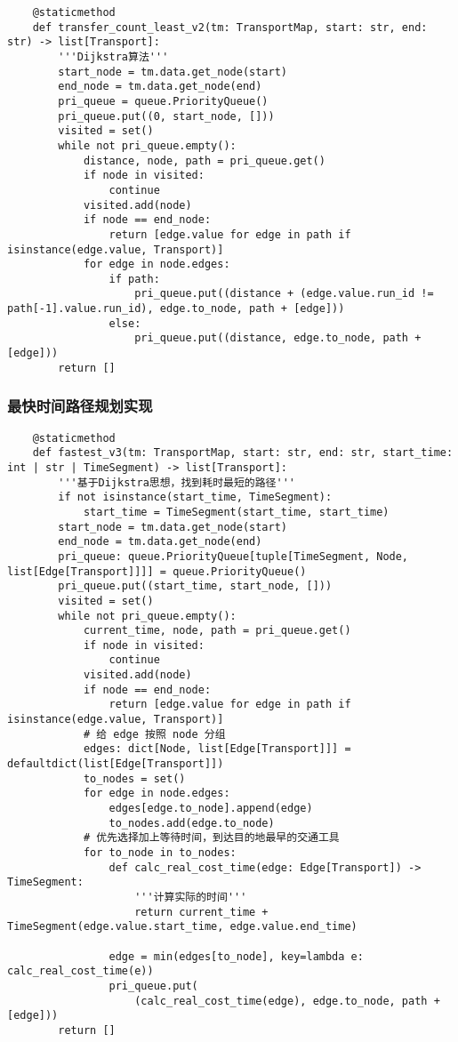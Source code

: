\documentclass[10pt]{article}
\begin{document}
    \begin{lstlisting}
    @staticmethod
    def transfer_count_least_v2(tm: TransportMap, start: str, end: str) -> list[Transport]:
        '''Dijkstra算法'''
        start_node = tm.data.get_node(start)
        end_node = tm.data.get_node(end)
        pri_queue = queue.PriorityQueue()
        pri_queue.put((0, start_node, []))
        visited = set()
        while not pri_queue.empty():
            distance, node, path = pri_queue.get()
            if node in visited:
                continue
            visited.add(node)
            if node == end_node:
                return [edge.value for edge in path if isinstance(edge.value, Transport)]
            for edge in node.edges:
                if path:
                    pri_queue.put((distance + (edge.value.run_id != path[-1].value.run_id), edge.to_node, path + [edge]))
                else:
                    pri_queue.put((distance, edge.to_node, path + [edge]))
        return []
    \end{lstlisting}

    \subsubsection{最快时间路径规划实现}
    \begin{lstlisting}
    @staticmethod
    def fastest_v3(tm: TransportMap, start: str, end: str, start_time: int | str | TimeSegment) -> list[Transport]:
        '''基于Dijkstra思想，找到耗时最短的路径'''
        if not isinstance(start_time, TimeSegment):
            start_time = TimeSegment(start_time, start_time)
        start_node = tm.data.get_node(start)
        end_node = tm.data.get_node(end)
        pri_queue: queue.PriorityQueue[tuple[TimeSegment, Node, list[Edge[Transport]]]] = queue.PriorityQueue()
        pri_queue.put((start_time, start_node, []))
        visited = set()
        while not pri_queue.empty():
            current_time, node, path = pri_queue.get()
            if node in visited:
                continue
            visited.add(node)
            if node == end_node:
                return [edge.value for edge in path if isinstance(edge.value, Transport)]
            # 给 edge 按照 node 分组
            edges: dict[Node, list[Edge[Transport]]] = defaultdict(list[Edge[Transport]])
            to_nodes = set()
            for edge in node.edges:
                edges[edge.to_node].append(edge)
                to_nodes.add(edge.to_node)
            # 优先选择加上等待时间，到达目的地最早的交通工具
            for to_node in to_nodes:
                def calc_real_cost_time(edge: Edge[Transport]) -> TimeSegment:
                    '''计算实际的时间'''
                    return current_time + TimeSegment(edge.value.start_time, edge.value.end_time)

                edge = min(edges[to_node], key=lambda e: calc_real_cost_time(e))
                pri_queue.put(
                    (calc_real_cost_time(edge), edge.to_node, path + [edge]))
        return []
    \end{lstlisting}
\end{document}
